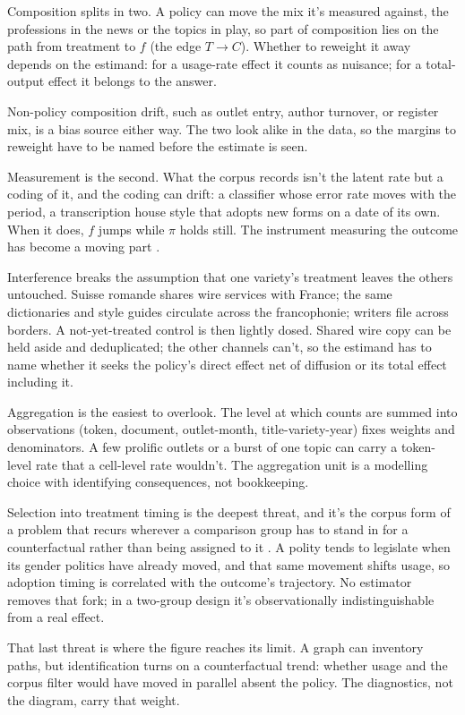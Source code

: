 Composition splits in two. A policy can move the mix it's measured against, the professions in the news or the topics in play, so part of composition lies on the path from treatment to $f$ (the edge $T \to C$). Whether to reweight it away depends on the estimand: for a usage-rate effect it counts as nuisance; for a total-output effect it belongs to the answer.

Non-policy composition drift, such as outlet entry, author turnover, or register mix, is a bias source either way. The two look alike in the data, so the margins to reweight have to be named before the estimate is seen.

Measurement is the second. What the corpus records isn't the latent rate but a coding of it, and the coding can drift: a classifier whose error rate moves with the period, a transcription house style that adopts new forms on a date of its own. When it does, $f$ jumps while $\pi$ holds still. The instrument measuring the outcome has become a moving part \citep{keith2020text}.

Interference breaks the assumption that one variety's treatment leaves the others untouched. Suisse romande shares wire services with France; the same dictionaries and style guides circulate across the francophonie; writers file across borders. A not-yet-treated control is then lightly dosed. Shared wire copy can be held aside and deduplicated; the other channels can't, so the estimand has to name whether it seeks the policy's direct effect net of diffusion or its total effect including it.

Aggregation is the easiest to overlook. The level at which counts are summed into observations (token, document, outlet-month, title-variety-year) fixes weights and denominators. A few prolific outlets or a burst of one topic can carry a token-level rate that a cell-level rate wouldn't. The aggregation unit is a modelling choice with identifying consequences, not bookkeeping.

Selection into treatment timing is the deepest threat, and it's the corpus form of a problem that recurs wherever a comparison group has to stand in for a counterfactual rather than being assigned to it \citep{OlsonDoyleJiang2026}. A polity tends to legislate when its gender politics have already moved, and that same movement shifts usage, so adoption timing is correlated with the outcome's trajectory. No estimator removes that fork; in a two-group design it's observationally indistinguishable from a real effect.

That last threat is where the figure reaches its limit. A graph can inventory paths, but identification turns on a counterfactual trend: whether usage and the corpus filter would have moved in parallel absent the policy. The diagnostics, not the diagram, carry that weight.

